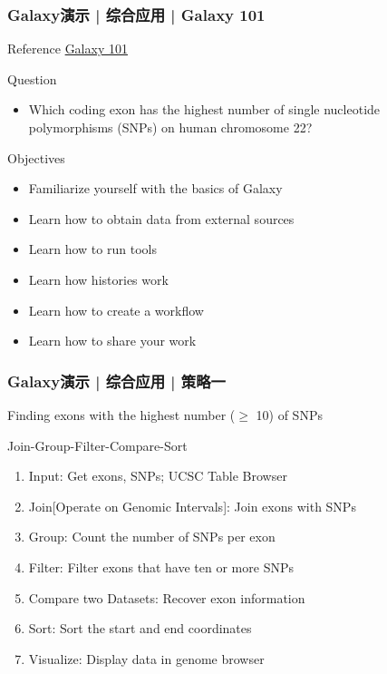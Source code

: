 \begin{frame}
  \frametitle{Galaxy演示 | \alert{综合应用} | Galaxy 101}
  \begin{block}{Reference}
  \href{https://galaxyproject.github.io/training-material/topics/introduction/tutorials/galaxy-intro-101/tutorial.html}{Galaxy 101}
  \end{block}
  \pause
  \begin{block}{Question}
    \begin{itemize}
      \item Which coding exon has the highest number of single nucleotide polymorphisms (SNPs) on human chromosome 22?
    \end{itemize}
  \end{block}
  \pause
  \begin{block}{Objectives}
    \begin{itemize}
      \item Familiarize yourself with the basics of Galaxy
      \item Learn how to obtain data from external sources
      \item Learn how to run tools
      \item Learn how histories work
      \item Learn how to create a workflow
      \item Learn how to share your work
    \end{itemize}
  \end{block}
\end{frame}

\begin{frame}
  \frametitle{Galaxy演示 | \alert{综合应用} | 策略一}
  \begin{block}{Finding exons with the highest number ($\geq$ 10) of SNPs}
    \pause
    \begin{block}{Join-Group-Filter-Compare-Sort}
    \pause
  \begin{enumerate}[<+-|alert@+>]
    \item Input: Get exons, SNPs; UCSC Table Browser
    \item Join[Operate on Genomic Intervals]: Join exons with SNPs
    \item Group: Count the number of SNPs per exon 
    \item Filter: Filter exons that have ten or more SNPs
    \item Compare two Datasets: Recover exon information
    \item Sort: Sort the start and end coordinates
    \item Visualize: Display data in genome browser
  \end{enumerate}
\end{block}
  \end{block}
\end{frame}


